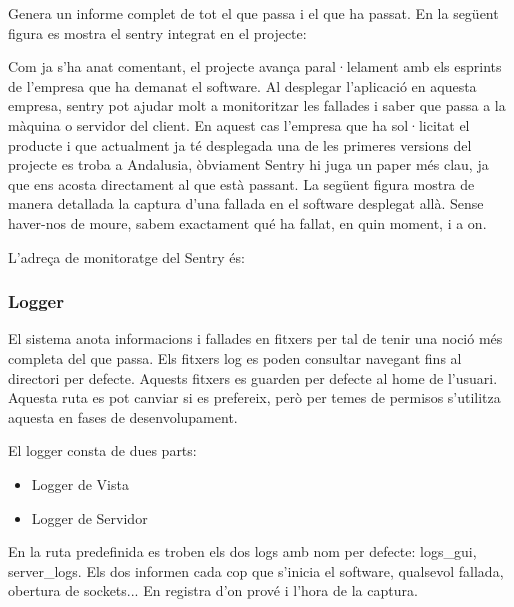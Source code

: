 \documentclass[letterpaper,11pt,catalan]{sphinxmanual}
\begin{document}
Genera un informe complet de tot el que passa i el que ha passat. En la següent figura
es mostra el sentry integrat en el projecte:


Com ja s'ha anat comentant, el projecte avança paral·lelament amb els esprints de l'empresa
que ha demanat el software. Al desplegar l'aplicació en aquesta empresa, sentry pot ajudar
molt a monitoritzar les fallades i saber que passa a la màquina o servidor del client. En
aquest cas l'empresa que ha sol·licitat el producte i que actualment ja té desplegada una de
les primeres versions del projecte es troba a Andalusia, òbviament Sentry hi juga un paper
més clau, ja que ens acosta directament al que està passant. La següent figura mostra de manera
detallada la captura d'una fallada en el software desplegat allà. Sense haver-nos de moure,
sabem exactament qué ha fallat, en quin moment, i a on.


L'adreça de monitoratge del Sentry és: 


\subsubsection{Logger}
\label{\detokenize{index:logger}}
El sistema anota informacions i fallades en fitxers  per tal de tenir una noció
més completa del que passa.
Els fitxers log es poden consultar navegant fins al directori per defecte. Aquests
fitxers es guarden per defecte al \sphinxquotedblleft{}home\sphinxquotedblright{} de l'usuari. Aquesta ruta es pot canviar si es prefereix,
però per temes de permisos s'utilitza aquesta en fases de desenvolupament.

El logger consta de dues parts:
\begin{itemize}
\item {} 
Logger de Vista

\item {} 
Logger de Servidor

\end{itemize}

En la ruta predefinida es troben els dos logs amb nom per defecte: logs\_gui, server\_logs.
Els dos informen cada cop que s'inicia el software, qualsevol fallada, obertura de sockets...
En registra d'on prové i l'hora de la captura.
\end{document}
